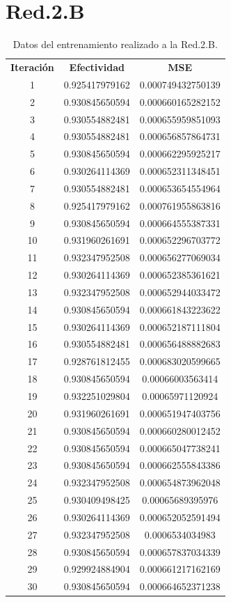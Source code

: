 \documentclass{iccmemoria}
\begin{document}
\section{Red.2.B}

\begin{longtable}{ccc} 
\caption{Datos del entrenamiento realizado a la Red.2.B.}\label{tab:training Red.2.B}\\

	\addlinespace
	\toprule
	\multicolumn{3}{c}{{\bf Entrenamiento Red.2.B}} \\
	\midrule
	{\bf Iteración} & {\bf Efectividad} & {\bf MSE} \\
	1 & 0.925417979162 & 0.000749432750139 \\
	2 & 0.930845650594 & 0.000660165282152 \\
	3 & 0.930554882481 & 0.000655959851093 \\
	4 & 0.930554882481 & 0.000656857864731 \\
	5 & 0.930845650594 & 0.000662295925217 \\
	6 & 0.930264114369 & 0.000652311348451 \\
	7 & 0.930554882481 & 0.000653654554964 \\
	8 & 0.925417979162 & 0.000761955863816 \\
	9 & 0.930845650594 & 0.000664555387331 \\
	10 & 0.931960261691 & 0.000652296703772 \\
	11 & 0.932347952508 & 0.000656277069034 \\
	12 & 0.930264114369 & 0.000652385361621 \\
	13 & 0.932347952508 & 0.000652944033472 \\
	14 & 0.930845650594 & 0.000661843223622 \\
	15 & 0.930264114369 & 0.000652187111804 \\
	16 & 0.930554882481 & 0.000656488882683 \\
	17 & 0.928761812455 & 0.000683020599665 \\
	18 & 0.930845650594 & 0.00066003563414 \\
	19 & 0.932251029804 & 0.00065971120924 \\
	20 & 0.931960261691 & 0.000651947403756 \\
	21 & 0.930845650594 & 0.000660280012452 \\
	22 & 0.930845650594 & 0.000665047738241 \\
	23 & 0.930845650594 & 0.000662555843386 \\
	24 & 0.932347952508 & 0.000654873962048 \\
	25 & 0.930409498425 & 0.00065689395976 \\
	26 & 0.930264114369 & 0.000652052591494 \\
	27 & 0.932347952508 & 0.0006534034983 \\
	28 & 0.930845650594 & 0.000657837034339 \\
	29 & 0.929924884904 & 0.000661217162169 \\
	30 & 0.930845650594 & 0.000664652371238 \\

	\bottomrule

\end{longtable}
\end{document}
